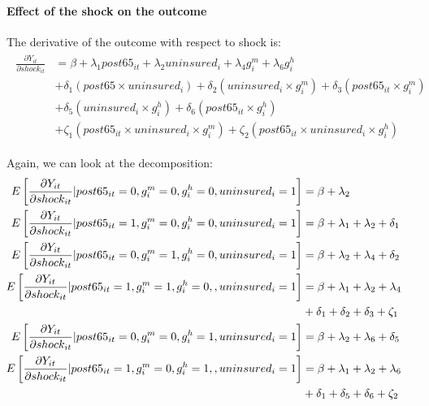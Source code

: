 \paragraph{Effect of the shock on the outcome}
The derivative of the outcome with respect to shock is:
\begin{align}
\begin{aligned}
\frac{\partial Y_{it}}{\partial shock_{it}}&=\beta+\lambda_1post65_{it}+\lambda_2uninsured_{i}+\lambda_4g^m_i+\lambda_6g^h_i\\
&+\delta_1(post65 \times uninsured_i)+\delta_2(uninsured_i \times g^m_i)+\delta_3(post65_{it} \times g^m_i)\\
&+\delta_5(uninsured_i \times g^h_i)+\delta_6(post65_{it} \times g^h_i)\\
&+\zeta_1(post65_{it} \times uninsured_i \times g^m_i)+\zeta_2(post65_{it} \times uninsured_i \times g^h_i)
\end{aligned}
\end{align}

Again, we can look at the decomposition:
\begin{align}
\phantom{E\left[ \frac{\partial Y_{it}}{\partial shock_{it}}| post65_{it}=1, g^m_i=1,g^h_i=1,uninsured_i=1\right]}
&\begin{aligned}
\mathllap{E\left[ \frac{\partial Y_{it}}{\partial shock_{it}}| post65_{it}=0, g^m_i=0,g^h_i=0,uninsured_i=1\right]} &=\beta+\lambda_2
\end{aligned}\\
&\begin{aligned}
\mathllap{E\left[ \frac{\partial Y_{it}}{\partial shock_{it}}| post65_{it}=1, g^m_i=0,g^h_i=0,uninsured_i=1\right]} &=\beta+\lambda_1+\lambda_2+\delta_1
\end{aligned}\\
&\begin{aligned}
\mathllap{E\left[ \frac{\partial Y_{it}}{\partial shock_{it}}| post65_{it}=0, g^m_i=1,g^h_i=0,uninsured_i=1\right]} &=\beta+\lambda_2+\lambda_4+\delta_2
\end{aligned}\\
&\begin{aligned}
\mathllap{E\left[ \frac{\partial Y_{it}}{\partial shock_{it}}| post65_{it}=1, g^m_i=1,g^h_i=0,,uninsured_i=1\right]} &=\beta+\lambda_1+\lambda_2+\lambda_4\\
&+\delta_1+\delta_2+\delta_3+\zeta_1
\end{aligned}\\
&\begin{aligned}
\mathllap{E\left[ \frac{\partial Y_{it}}{\partial shock_{it}}| post65_{it}=0, g^m_i=0,g^h_i=1,uninsured_i=1\right]} &=\beta+\lambda_2+\lambda_6+\delta_5
\end{aligned}\\
&\begin{aligned}
\mathllap{E\left[ \frac{\partial Y_{it}}{\partial shock_{it}}| post65_{it}=1, g^m_i=0,g^h_i=1,,uninsured_i=1\right]} &=\beta+\lambda_1+\lambda_2+\lambda_6\\
&+\delta_1+\delta_5+\delta_6+\zeta_2
\end{aligned}
\end{align}

